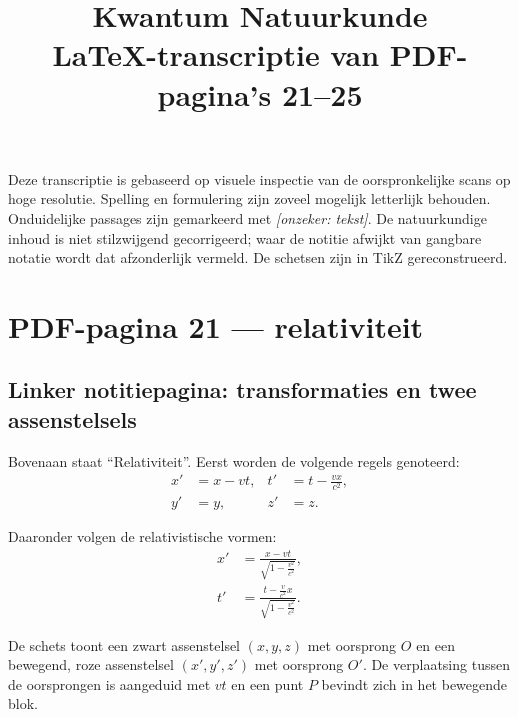 \documentclass[11pt,a4paper]{article}
\title{\textbf{Kwantum Natuurkunde}\\
\large LaTeX-transcriptie van PDF-pagina's 21--25}
\author{}
\date{}
\newcommand{\uncertain}[1]{\textcolor{uncertain}{\textit{[onzeker: #1]}}}
\begin{document}
\maketitle

\noindent
Deze transcriptie is gebaseerd op visuele inspectie van de oorspronkelijke
scans op hoge resolutie. Spelling en formulering zijn zoveel mogelijk letterlijk
behouden. Onduidelijke passages zijn gemarkeerd met \uncertain{tekst}. De
natuurkundige inhoud is niet stilzwijgend gecorrigeerd; waar de notitie afwijkt
van gangbare notatie wordt dat afzonderlijk vermeld. De schetsen zijn in TikZ
gereconstrueerd.

\section*{PDF-pagina 21 --- relativiteit}

\subsection*{Linker notitiepagina: transformaties en twee assenstelsels}

Bovenaan staat ``Relativiteit''. Eerst worden de volgende regels genoteerd:
\begin{align*}
x' &= x-vt, &
t' &= t-\frac{vx}{c^2},\\
y' &= y, &
z' &= z.
\end{align*}

Daaronder volgen de relativistische vormen:
\begin{align*}
x' &= \frac{x-vt}{\sqrt{1-\frac{v^2}{c^2}}},\\
t' &= \frac{t-\frac{v}{c^2}x}{\sqrt{1-\frac{v^2}{c^2}}}.
\end{align*}

De schets toont een zwart assenstelsel $(x,y,z)$ met oorsprong $O$ en een
bewegend, roze assenstelsel $(x',y',z')$ met oorsprong $O'$. De verplaatsing
tussen de oorsprongen is aangeduid met $vt$ en een punt $P$ bevindt zich in het
bewegende blok.
\end{document}
